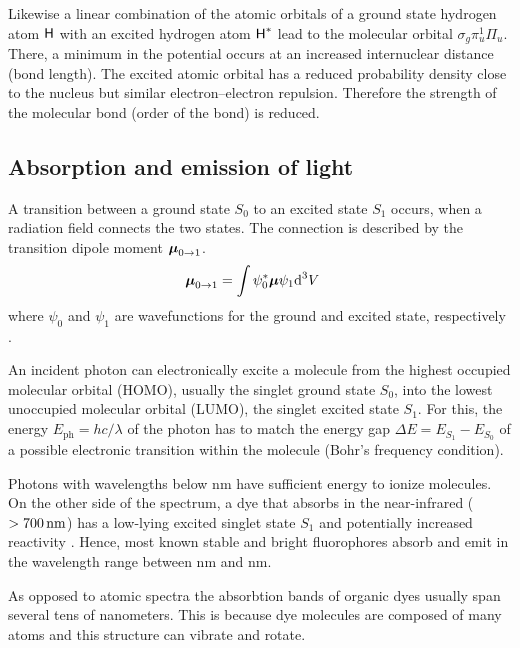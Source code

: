 Likewise a linear combination of the atomic orbitals of a ground state
hydrogen atom $\textsf{H}$ with an excited hydrogen atom $\textsf{H}^*$ lead to the
molecular orbital $\sigma_g\pi_u^1\Pi_u$. There, a minimum in the
potential occurs at an increased internuclear distance (bond
length). The excited atomic orbital has a reduced probability density
close to the nucleus but similar electron--electron
repulsion. Therefore the strength of the molecular bond (order of the
bond) is reduced.
\newcommand{\vmu}{\mbox{\boldmath{$\mu$}}}
\subsection{Absorption and emission of light}
A transition between a ground state $S_0$ to an excited state $S_1$
occurs, when a radiation field connects the two states. The connection
is described by the transition dipole moment
$\vmu_{0\rightarrow 1}$.
\begin{align}
  \vmu_{0\rightarrow 1} &= \int \psi^*_0 \vmu \psi_1 \textrm{d}^3V
\end{align}
where $\psi_0$ and $\psi_1$ are wavefunctions for the ground and
excited state, respectively \citep{Linde2011a}.

An incident photon can electronically excite a molecule from the
highest occupied molecular orbital (HOMO), usually the singlet ground
state $S_0$, into the lowest unoccupied molecular orbital (LUMO), the
singlet excited state $S_1$. For this, the energy $E_\textrm{ph}=hc/\lambda$ of the
photon has to match the energy gap $\Delta E=E_{S_1}-E_{S_0}$ of a
possible electronic transition within the molecule (Bohr's frequency
condition).

Photons with wavelengths below \unit[200]{nm} have sufficient energy
to ionize molecules. On the other side of the spectrum, a dye that
absorbs in the near-infrared ($\unit[>700]{nm}$) has a low-lying
excited singlet state $S_1$ and potentially increased reactivity
\citep{Sauer2011}. Hence, most known stable and bright fluorophores
absorb and emit in the wavelength range between \unit[300]{nm} and
\unit[700]{nm}.

As opposed to atomic spectra the absorbtion bands of organic dyes
usually span several tens of nanometers. This is because dye molecules
are composed of many atoms and this structure can vibrate and rotate.
